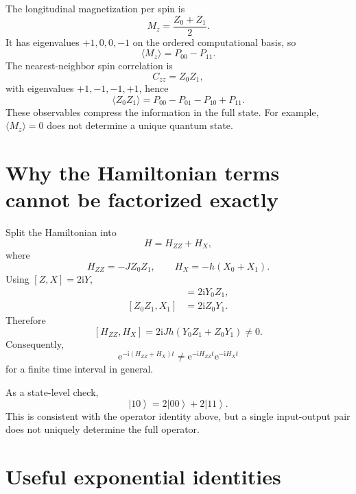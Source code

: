 \documentclass[11pt,a4paper]{article}
\newcommand{\ket}[1]{\left|#1\right\rangle}
\newcommand{\e}{\mathrm{e}}
\newcommand{\ii}{\mathrm{i}}
\begin{document}
The longitudinal magnetization per spin is
\begin{equation}
M_z=\frac{Z_0+Z_1}{2}.
\end{equation}
It has eigenvalues $+1,0,0,-1$ on the ordered computational basis, so
\begin{equation}
\boxed{\langle M_z\rangle=P_{00}-P_{11}}.
\end{equation}
The nearest-neighbor spin correlation is
\begin{equation}
C_{zz}=Z_0Z_1,
\end{equation}
with eigenvalues $+1,-1,-1,+1$, hence
\begin{equation}
\boxed{\langle Z_0Z_1\rangle=P_{00}-P_{01}-P_{10}+P_{11}}.
\end{equation}
These observables compress the information in the full state. For example, $\langle M_z\rangle=0$ does not determine a unique quantum state.

\section{Why the Hamiltonian terms cannot be factorized exactly}

Split the Hamiltonian into
\begin{equation}
H=H_{ZZ}+H_X,
\end{equation}
where
\begin{equation}
H_{ZZ}=-JZ_0Z_1,\qquad H_X=-h(X_0+X_1).
\end{equation}
Using $[Z,X]=2\ii Y$,
\begin{align}
[Z_0Z_1,X_0]&=2\ii Y_0Z_1,\\
[Z_0Z_1,X_1]&=2\ii Z_0Y_1.
\end{align}
Therefore
\begin{equation}
\boxed{[H_{ZZ},H_X]=2\ii Jh\left(Y_0Z_1+Z_0Y_1\right)\neq0.}
\end{equation}
Consequently,
\begin{equation}
\e^{-\ii(H_{ZZ}+H_X)t}\neq
\e^{-\ii H_{ZZ}t}\e^{-\ii H_Xt}
\end{equation}
for a finite time interval in general.

As a state-level check,
\begin{equation}
[Z_0Z_1,X_0+X_1]\ket{10}=2\ket{00}+2\ket{11}.
\end{equation}
This is consistent with the operator identity above, but a single input-output pair does not uniquely determine the full operator.

\section{Useful exponential identities}
\end{document}
